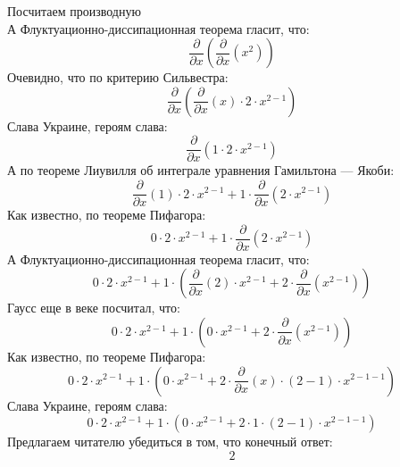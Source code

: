\documentclass[12pt]{article}
\begin{document}
\newpage                                                  
\Huge                                                     
	Посчитаем производную\\                                
\newline                                                  
\normalfont                                               
\normalsize                                               
А Флуктуационно-диссипационная теорема гласит, что:  \begin{equation}
	\frac{\partial}{\partial x}\left( \frac{\partial}{\partial x}\left( x^{2}\right) \right) 
\end{equation}
Очевидно, что по критерию Сильвестра:  \begin{equation}
	\frac{\partial}{\partial x}\left( \frac{\partial}{\partial x}\left( x\right) \cdot 2\cdot x^{2 - 1}\right) 
\end{equation}
Слава Украине, героям слава:  \begin{equation}
	\frac{\partial}{\partial x}\left( 1\cdot 2\cdot x^{2 - 1}\right) 
\end{equation}
А по теореме Лиувилля об интеграле уравнения Гамильтона — Якоби:  \begin{equation}
	\frac{\partial}{\partial x}\left( 1\right) \cdot 2\cdot x^{2 - 1} + 1\cdot \frac{\partial}{\partial x}\left( 2\cdot x^{2 - 1}\right) 
\end{equation}
Как известно, по теореме Пифагора:  \begin{equation}
	0\cdot 2\cdot x^{2 - 1} + 1\cdot \frac{\partial}{\partial x}\left( 2\cdot x^{2 - 1}\right) 
\end{equation}
А Флуктуационно-диссипационная теорема гласит, что:  \begin{equation}
	0\cdot 2\cdot x^{2 - 1} + 1\cdot \left( \frac{\partial}{\partial x}\left( 2\right) \cdot x^{2 - 1} + 2\cdot \frac{\partial}{\partial x}\left( x^{2 - 1}\right) \right) 
\end{equation}
Гаусс еще в  веке посчитал, что:  \begin{equation}
	0\cdot 2\cdot x^{2 - 1} + 1\cdot \left( 0\cdot x^{2 - 1} + 2\cdot \frac{\partial}{\partial x}\left( x^{2 - 1}\right) \right) 
\end{equation}
Как известно, по теореме Пифагора:  \begin{equation}
	0\cdot 2\cdot x^{2 - 1} + 1\cdot \left( 0\cdot x^{2 - 1} + 2\cdot \frac{\partial}{\partial x}\left( x\right) \cdot \left( 2 - 1\right) \cdot x^{2 - 1 - 1}\right) 
\end{equation}
Слава Украине, героям слава:  \begin{equation}
	0\cdot 2\cdot x^{2 - 1} + 1\cdot \left( 0\cdot x^{2 - 1} + 2\cdot 1\cdot \left( 2 - 1\right) \cdot x^{2 - 1 - 1}\right) 
\end{equation}
Предлагаем читателю убедиться в том, что конечный ответ: 
\begin{equation}
	2
\end{equation}
\end{document}
